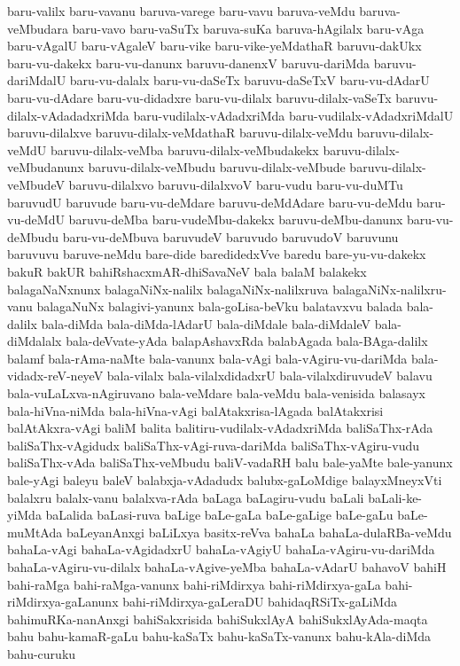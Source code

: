{baru-valilx
baru-vavanu
baruva-varege
baru-vavu
baruva-veMdu
baruva-veMbudara
baru-vavo
baru-vaSuTx
baruva-suKa
baruva-hAgilalx
baru-vAga
baru-vAgalU
baru-vAgaleV
baru-vike
baru-vike-yeMdathaR
baruvu-dakUkx
baru-vu-dakekx
baru-vu-danunx
baruvu-danenxV
baruvu-dariMda
baruvu-dariMdalU
baru-vu-dalalx
baru-vu-daSeTx
baruvu-daSeTxV
baru-vu-dAdarU
baru-vu-dAdare
baru-vu-didadxre
baru-vu-dilalx
baruvu-dilalx-vaSeTx
baruvu-dilalx-vAdadadxriMda
baru-vudilalx-vAdadxriMda
baru-vudilalx-vAdadxriMdalU
baruvu-dilalxve
baruvu-dilalx-veMdathaR
baruvu-dilalx-veMdu
baruvu-dilalx-veMdU
baruvu-dilalx-veMba
baruvu-dilalx-veMbudakekx
baruvu-dilalx-veMbudanunx
baruvu-dilalx-veMbudu
baruvu-dilalx-veMbude
baruvu-dilalx-veMbudeV
baruvu-dilalxvo
baruvu-dilalxvoV
baru-vudu
baru-vu-duMTu
baruvudU
baruvude
baru-vu-deMdare
baruvu-deMdAdare
baru-vu-deMdu
baru-vu-deMdU
baruvu-deMba
baru-vudeMbu-dakekx
baruvu-deMbu-danunx
baru-vu-deMbudu
baru-vu-deMbuva
baruvudeV
baruvudo
baruvudoV
baruvunu
baruvuvu
baruve-neMdu
bare-dide
baredidedxVve
baredu
bare-yu-vu-dakekx
bakuR
bakUR
bahiRshacxmAR-dhiSavaNeV
bala
balaM
balakekx
balagaNaNxnunx
balagaNiNx-nalilx
balagaNiNx-nalilxruva
balagaNiNx-nalilxru-vanu
balagaNuNx
balagivi-yanunx
bala-goLisa-beVku
balatavxvu
balada
bala-dalilx
bala-diMda
bala-diMda-lAdarU
bala-diMdale
bala-diMdaleV
bala-diMdalalx
bala-deVvate-yAda
balapAshavxRda
balabAgada
bala-BAga-dalilx
balamf
bala-rAma-naMte
bala-vanunx
bala-vAgi
bala-vAgiru-vu-dariMda
bala-vidadx-reV-neyeV
bala-vilalx
bala-vilalxdidadxrU
bala-vilalxdiruvudeV
balavu
bala-vuLaLxva-nAgiruvano
bala-veMdare
bala-veMdu
bala-venisida
balasayx
bala-hiVna-niMda
bala-hiVna-vAgi
balAtakxrisa-lAgada
balAtakxrisi
balAtAkxra-vAgi
baliM
balita
balitiru-vudilalx-vAdadxriMda
baliSaThx-rAda
baliSaThx-vAgidudx
baliSaThx-vAgi-ruva-dariMda
baliSaThx-vAgiru-vudu
baliSaThx-vAda
baliSaThx-veMbudu
baliV-vadaRH
balu
bale-yaMte
bale-yanunx
bale-yAgi
baleyu
baleV
balabxja-vAdadudx
balubx-gaLoMdige
balayxMneyxVti
balalxru
balalx-vanu
balalxva-rAda
baLaga
baLagiru-vudu
baLali
baLali-ke-yiMda
baLalida
baLasi-ruva
baLige
baLe-gaLa
baLe-gaLige
baLe-gaLu
baLe-muMtAda
baLeyanAnxgi
baLiLxya
basitx-reVva
bahaLa
bahaLa-dulaRBa-veMdu
bahaLa-vAgi
bahaLa-vAgidadxrU
bahaLa-vAgiyU
bahaLa-vAgiru-vu-dariMda
bahaLa-vAgiru-vu-dilalx
bahaLa-vAgive-yeMba
bahaLa-vAdarU
bahavoV
bahiH
bahi-raMga
bahi-raMga-vanunx
bahi-riMdirxya
bahi-riMdirxya-gaLa
bahi-riMdirxya-gaLanunx
bahi-riMdirxya-gaLeraDU
bahidaqRSiTx-gaLiMda
bahimuRKa-nanAnxgi
bahiSakxrisida
bahiSukxlAyA
bahiSukxlAyAda-maqta
bahu
bahu-kamaR-gaLu
bahu-kaSaTx
bahu-kaSaTx-vanunx
bahu-kAla-diMda
bahu-curuku
}
